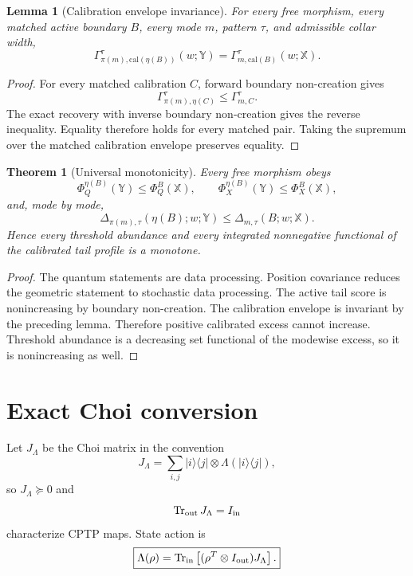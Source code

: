 \documentclass[11pt]{article}
\newtheorem{theorem}{Theorem}
\newtheorem{lemma}{Lemma}
\newcommand{\Tr}{\operatorname{Tr}}
\begin{document}
\begin{lemma}[Calibration envelope invariance]
For every free morphism, every matched active boundary \(B\), every mode \(m\), pattern \(\tau\), and admissible collar width,
\[
\Gamma_{\pi(m),\mathrm{cal}(\eta(B))}^{\tau}(w;\mathbb Y)
=
\Gamma_{m,\mathrm{cal}(B)}^{\tau}(w;\mathbb X).
\]
\end{lemma}

\begin{proof}
For every matched calibration \(C\), forward boundary non-creation gives
\[
\Gamma_{\pi(m),\eta(C)}^{\tau}
\le
\Gamma_{m,C}^{\tau}.
\]
The exact recovery with inverse boundary non-creation gives the reverse inequality. Equality therefore holds for every matched pair. Taking the supremum over the matched calibration envelope preserves equality.
\end{proof}

\begin{theorem}[Universal monotonicity]
Every free morphism obeys
\[
\Phi_Q^{\eta(B)}(\mathbb Y)
\le
\Phi_Q^B(\mathbb X),
\qquad
\Phi_X^{\eta(B)}(\mathbb Y)
\le
\Phi_X^B(\mathbb X),
\]
and, mode by mode,
\[
\Delta_{\pi(m),\tau}(\eta(B);w;\mathbb Y)
\le
\Delta_{m,\tau}(B;w;\mathbb X).
\]
Hence every threshold abundance and every integrated nonnegative functional of the calibrated tail profile is a monotone.
\end{theorem}

\begin{proof}
The quantum statements are data processing. Position covariance reduces the geometric statement to stochastic data processing. The active tail score is nonincreasing by boundary non-creation. The calibration envelope is invariant by the preceding lemma. Therefore positive calibrated excess cannot increase. Threshold abundance is a decreasing set functional of the modewise excess, so it is nonincreasing as well.
\end{proof}

\section{Exact Choi conversion}
\label{sec:choi}

Let \(J_\Lambda\) be the Choi matrix in the convention
\[
J_\Lambda
=\sum_{i,j}|i\rangle\langle j|\otimes\Lambda(|i\rangle\langle j|),
\]
so \(J_\Lambda\succeq0\) and
\[
\Tr_{\rm out}J_\Lambda=I_{\rm in}
\]
characterize CPTP maps. State action is
\[
\boxed{
\Lambda(\rho)
=
\Tr_{\rm in}\left[(\rho^T\otimes I_{\rm out})J_\Lambda\right].
}
\]
\end{document}
